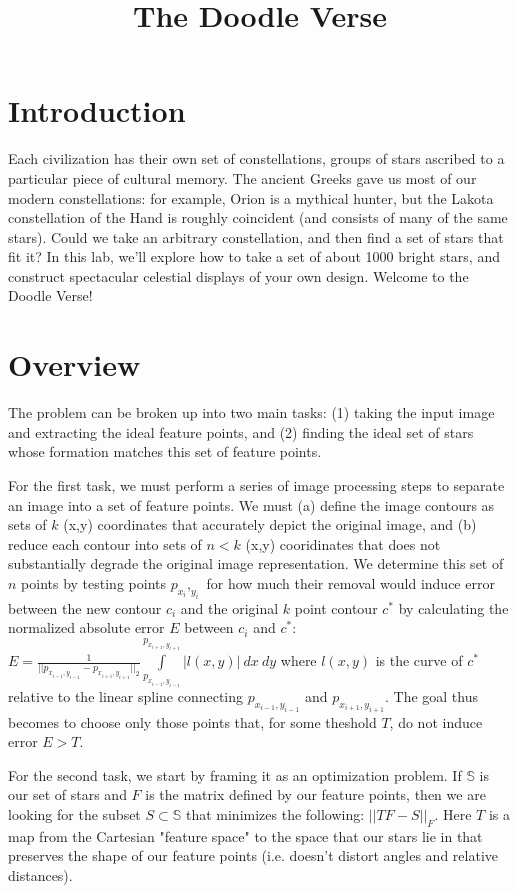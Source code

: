 \documentclass[paper=a4, fontsize=11pt]{scrartcl} %
\title{
\normalfont \normalsize
\huge The Doodle Verse \\ %
}
\date{}
\begin{document}
\maketitle

\section{Introduction}

Each civilization has their own set of constellations, groups of stars ascribed to a particular piece of cultural
memory. The ancient Greeks gave us most of our modern constellations: for example, Orion is a mythical
hunter, but the Lakota constellation of the Hand is roughly coincident (and consists of many of the same
stars). Could we take an arbitrary constellation, and then find a set of stars that fit it? In this lab, we’ll
explore how to take a set of about 1000 bright stars, and construct spectacular celestial displays of your own
design. Welcome to the Doodle Verse!

\section{Overview}

The problem can be broken up into two main tasks: (1) taking the input image and extracting the ideal feature points, and (2) finding the ideal set of stars whose formation matches this set of feature points.

For the first task, we must perform a series of image processing steps to separate an image into a set of feature points. We must (a) define the image contours as sets of $k$ (x,y) coordinates that accurately depict the original image, and (b) reduce each contour into sets of $n<k$ (x,y) cooridinates that does not substantially degrade the original image representation. We determine this set of $n$ points by testing points $p_{x_i},_{y_i}$ for how much their removal would induce error between the new contour $c_i$ and the original $k$ point contour $c^*$ by calculating the normalized absolute error $E$ between $c_i$ and $c^*$: $E = \frac{1}{|| p_{x_{i-1},y_{i-1}}  -  p_{x_{i+1},y_{i+1}} ||_2} \int\limits_{p_{x_{i-1},y_{i-1}}}^{p_{x_{i+1},y_{i+1}}} |l(x,y)| \ dx \ dy$ where $l(x,y)$ is the curve of $c^*$ relative to the linear spline connecting $p_{x_{i-1},y_{i-1}}$ and $p_{x_{i+1},y_{i+1}}$. The goal thus becomes to choose only those points that, for some theshold $T$, do not induce error $E > T$. 

For the second task, we start by framing it as an optimization problem. If $\mathbb{S}$ is our set of stars and $F$ is the matrix defined by our feature points, then we are looking for the subset $S\subset\mathbb{S}$ that minimizes the following: $||TF - S||_F$.  Here $T$ is a map from the Cartesian "feature space" to the space that our stars lie in that preserves the shape of our feature points (i.e. doesn't distort angles and relative distances).
\end{document}
